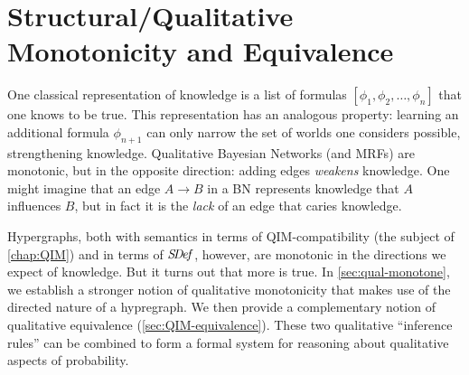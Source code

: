 

\section{Structural/Qualitative Monotonicity and Equivalence}

One classical representation of knowledge is a list of formulas
    $[ \phi_1, \phi_2, \ldots, \phi_n]$
    that one knows to be true.
This representation has an analogous property:
    learning an additional formula $\phi_{n+1}$
    can only narrow the set of worlds one considers possible,
    strengthening knowledge. 
Qualitative Bayesian Networks (and MRFs) are monotonic,
	but in the opposite direction:
        adding edges \emph{weakens} knowledge.
One might imagine that an edge $A{\to}B$
	in a BN represents knowledge that $A$ influences $B$, 
	but in fact it is the \emph{lack} of an edge that caries knowledge.

Hypergraphs, both with semantics in terms of QIM-compatibility (the subject of \cref{chap:QIM}) and in terms of $\mathit{S\mskip-3.5muD\mskip-2.5mue\mskip-1.5muf}$, however, are monotonic in the directions we expect of knowledge.
But it turns out that more is true. 
In \cref{sec:qual-monotone}, we establish a stronger notion of qualitative monotonicity that makes use of the directed nature of a hypregraph. 
We then provide a complementary notion of qualitative equivalence (\cref{sec:QIM-equivalence}). 
These two qualitative ``inference rules'' can be combined to form a formal system for reasoning about qualitative aspects of probability. 

